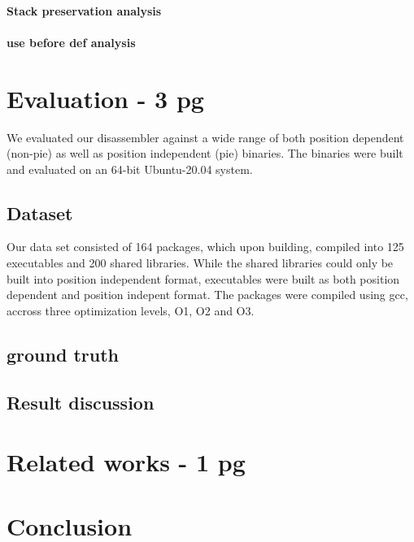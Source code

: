 \paragraph{Stack preservation analysis}
\paragraph{use before def analysis}

\section{Evaluation - 3 pg}
We evaluated our disassembler against a wide range of both position dependent
(non-pie) as well as position independent (pie) binaries. The binaries were
built and evaluated on an 64-bit Ubuntu-20.04 system.
\subsection{Dataset}
Our data set consisted of 164 packages, which upon building, compiled into 125
executables and 200 shared libraries. While the shared libraries could only be
built into position independent format, executables were built as both position
dependent and position indepent format. The packages were compiled using gcc,
accross three optimization levels, O1, O2 and O3.
\subsection{ground truth}
\subsection{Result discussion}

\section{Related works - 1 pg}
\section{Conclusion}
